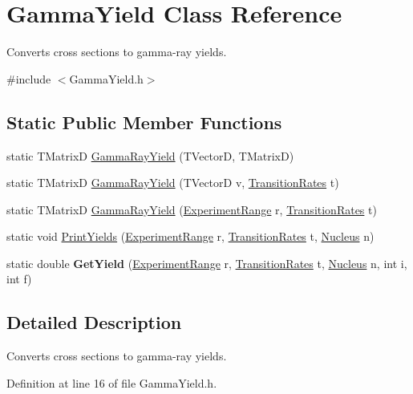 \hypertarget{classGammaYield}{\section{Gamma\-Yield Class Reference}
\label{classGammaYield}
}


Converts cross sections to gamma-\/ray yields.  




{\ttfamily \#include $<$Gamma\-Yield.\-h$>$}

\subsection*{Static Public Member Functions}
\begin{DoxyCompactItemize}
\item 
static T\-Matrix\-D \hyperlink{classGammaYield_ae2eae4ee7762789e0a70765e09b8383e}{Gamma\-Ray\-Yield} (T\-Vector\-D, T\-Matrix\-D)
\item 
static T\-Matrix\-D \hyperlink{classGammaYield_adbeac7ddd28892dcc254452e6365e851}{Gamma\-Ray\-Yield} (T\-Vector\-D v, \hyperlink{classTransitionRates}{Transition\-Rates} t)
\item 
static T\-Matrix\-D \hyperlink{classGammaYield_a1345958656129277ed4371937903b363}{Gamma\-Ray\-Yield} (\hyperlink{classExperimentRange}{Experiment\-Range} r, \hyperlink{classTransitionRates}{Transition\-Rates} t)
\item 
static void \hyperlink{classGammaYield_adc91c5581c8f77170515083002d8422f}{Print\-Yields} (\hyperlink{classExperimentRange}{Experiment\-Range} r, \hyperlink{classTransitionRates}{Transition\-Rates} t, \hyperlink{classNucleus}{Nucleus} n)
\item 
\hypertarget{classGammaYield_a8a83680f6744d15cc4764312cf90a66e}{static double {\bfseries Get\-Yield} (\hyperlink{classExperimentRange}{Experiment\-Range} r, \hyperlink{classTransitionRates}{Transition\-Rates} t, \hyperlink{classNucleus}{Nucleus} n, int i, int f)}\label{classGammaYield_a8a83680f6744d15cc4764312cf90a66e}

\end{DoxyCompactItemize}


\subsection{Detailed Description}
Converts cross sections to gamma-\/ray yields. 

Definition at line 16 of file Gamma\-Yield.\-h.



